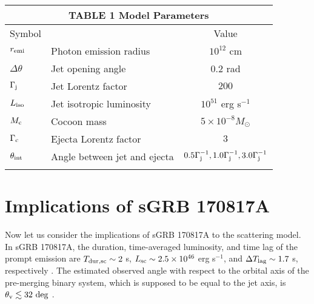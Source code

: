 \documentclass{emulateapj}
\begin{document}
\begin{table}
 \begin{center}
  \begin{tabular}{llc}
\multicolumn{3}{c}{TABLE 1 Model Parameters} \\ \hline
Symbol & & Value \\ \hline
$r_{\rm emi}$ & Photon emission radius & $10^{12}$ cm        \\
$\Delta\theta$  & Jet opening angle & $0.2$ rad   \\
$\Gamma_{\rm j}$ & Jet Lorentz factor & $200$   \\
$L_{\rm iso}$ & Jet isotropic luminosity & $10^{51}$ erg s$^{-1}$   \\
$M_{\rm c}$ & Cocoon mass & $5\times10^{-8}M_{\odot}$ \\
$\Gamma_{\rm c}$ & Ejecta Lorentz factor & $3$ \\
$\theta_{\rm int}$ & Angle between jet and ejecta & $0.5\Gamma_{\rm j}^{-1}, 1.0\Gamma_{\rm j}^{-1}, 3.0\Gamma_{\rm j}^{-1}$ \\ \hline
 \label{tab:parameter}
  \end{tabular}
 \end{center}
 \end{table}


\section{Implications of sGRB 170817A}
\label{sec:implications}

Now let us consider the implications of sGRB 170817A to the scattering model. 
In sGRB 170817A, the duration, time-averaged luminosity, and time lag
of the prompt emission are
$T_{\rm dur,sc}\sim2$ s, $L_{\rm sc}\sim2.5\times10^{46}$ erg s$^{-1}$, and $\Delta T_{\rm lag}\sim1.7$ s, 
respectively \citep{2017arXiv171005446G}.
The estimated observed angle with respect to the orbital axis of the pre-merging binary system, 
which is supposed to be equal to the jet axis, is 
$\theta_{\rm v} \lesssim 32 \ \rm deg$ \citep{2017PhRvL.119p1101A, 2017Natur.551...85A}.  
\end{document}
